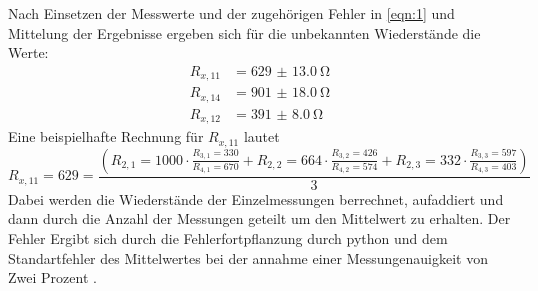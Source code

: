 \noindent Nach Einsetzen der Messwerte und der zugehörigen Fehler in
\autoref{eqn:1} und Mittelung der Ergebnisse ergeben sich für die unbekannten
Wiederstände die Werte:
\begin{align*}
       R_{x,11} &= \qty{629(13.0)}{\ohm}\\
       R_{x,14} &= \qty{901(18.0)}{\ohm}\\
       R_{x,12} &= \qty{391(8.0)}{\ohm}
\end{align*}
Eine beispielhafte Rechnung für $R_{x,11}$ lautet
\begin{equation}
       R_{x,11}= 629 = \frac{\left(R_{2,1}=1000 \cdot \frac{R_{3,1}=330}{R_{4,1}=670}+R_{2,2}=664 \cdot \frac{R_{3,2}=426}{R_{4,2}=574}+R_{2,3}=332 \cdot \frac{R_{3,3}=597}{R_{4,3}=403}\right)}{3}
\end{equation}
Dabei werden die Wiederstände der Einzelmessungen berrechnet, aufaddiert und dann durch die Anzahl der Messungen geteilt um den Mittelwert zu erhalten. Der Fehler 
Ergibt sich durch die Fehlerfortpflanzung durch python und dem Standartfehler des Mittelwertes bei der annahme einer Messungenauigkeit von Zwei Prozent .


